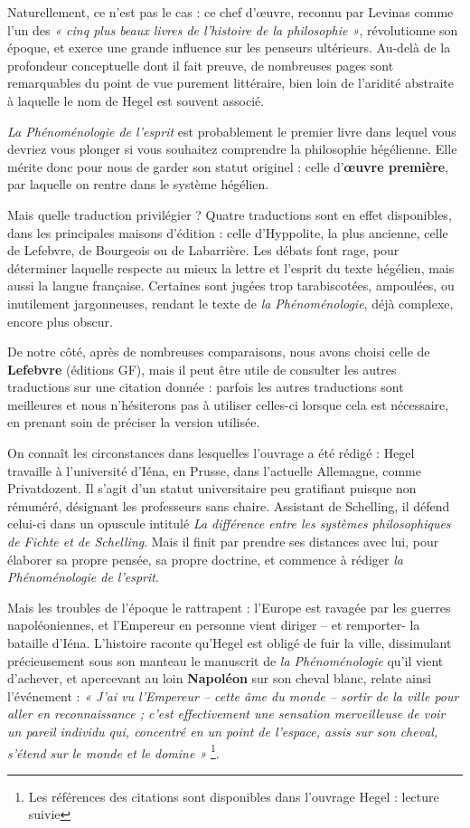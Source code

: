Naturellement, ce n’est pas le cas : ce chef d’œuvre, reconnu par Levinas comme l’un des {\it « cinq plus beaux livres de l’histoire de la philosophie »}, révolutionne son époque, et exerce une grande influence sur les penseurs ultérieurs. Au-delà de la profondeur conceptuelle dont il fait preuve, de nombreuses pages sont remarquables du point de vue purement littéraire, bien loin de l’aridité abstraite à laquelle le nom de Hegel est souvent associé.

{\it La Phénoménologie de l’esprit} est probablement le premier livre dans lequel vous devriez vous plonger si vous souhaitez comprendre la philosophie hégélienne. Elle mérite donc pour nous de garder son statut originel : celle d’{\bf œuvre première}, par laquelle on rentre dans le système hégélien.

Mais quelle traduction privilégier ? Quatre traductions sont en effet disponibles, dans les principales maisons d’édition : celle d’Hyppolite, la plus ancienne, celle de Lefebvre, de Bourgeois ou de Labarrière. Les débats font rage, pour déterminer laquelle respecte au mieux la lettre et l’esprit du texte hégélien, mais aussi la langue française. Certaines sont jugées trop tarabiscotées, ampoulées, ou inutilement jargonneuses, rendant le texte de {\it la Phénoménologie}, déjà complexe, encore plus obscur.

De notre côté, après de nombreuses comparaisons, nous avons choisi celle de {\bf Lefebvre} (éditions GF), mais il peut être utile de consulter les autres traductions sur une citation donnée : parfois les autres traductions sont meilleures et nous n’hésiterons pas à utiliser celles-ci lorsque cela est nécessaire, en prenant soin de préciser la version utilisée.

On connaît les circonstances dans lesquelles l’ouvrage a été rédigé : Hegel travaille à l’université d’Iéna, en Prusse, dans l’actuelle Allemagne, comme Privatdozent. Il s’agit d’un statut universitaire peu gratifiant puisque non rémunéré, désignant les professeurs sans chaire. Assistant de Schelling, il défend celui-ci dans un opuscule intitulé {\it La différence entre les systèmes philosophiques de Fichte et de Schelling}. Mais il finit par prendre ses distances avec lui, pour élaborer sa propre pensée, sa propre doctrine, et commence à rédiger {\it la Phénoménologie de l’esprit}.

Mais les troubles de l’époque le rattrapent : l’Europe est ravagée par les guerres napoléoniennes, et l’Empereur en personne vient diriger – et remporter- la bataille d’Iéna. L’histoire raconte qu’Hegel est obligé de fuir la ville, dissimulant précieusement sous son manteau le manuscrit de {\it la Phénoménologie} qu’il vient d’achever, et apercevant au loin {\bf Napoléon} sur son cheval blanc, relate ainsi l’événement : {\it « J’ai vu l’Empereur – cette âme du monde – sortir de la ville pour aller en reconnaissance ; c’est effectivement une sensation merveilleuse de voir un pareil individu qui, concentré en un point de l’espace, assis sur son cheval, s’étend sur le monde et le domine »} \footnote{Les références des citations sont disponibles dans l'ouvrage Hegel : lecture suivie}.

